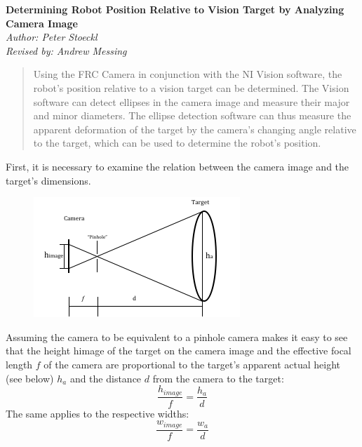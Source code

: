 \documentclass{article}
\begin{document}
\begin{titlepage}
   \begin{center}
      \Large\textbf{Determining Robot Position Relative to Vision Target by Analyzing Camera Image}\\
      \large\textit{Author: Peter Stoeckl}\\
      \large\textit{Revised by: Andrew Messing}
   \end{center}
\end{titlepage}

\begin{abstract}
Using the FRC Camera in conjunction with the NI Vision software, the robot’s position relative to a vision target can be determined. The Vision software can detect ellipses in the camera image and measure their major and minor diameters. The ellipse detection software can thus measure the apparent deformation of the target by the camera’s changing angle relative to the target, which can be used to determine the robot’s position. 
\end{abstract}

First, it is necessary to examine the relation between the camera image and the target’s dimensions.

		\begin{figure}[!htbp]

		\centering

		\includegraphics{pinhole_model.png}

		\end{figure}

Assuming the camera to be equivalent to a pinhole camera makes it easy to see that the height himage of the target on the camera image and the effective focal length $f$ of the camera are proportional to the target’s apparent actual height (see below) $h_{a}$ and the distance $d$ from the camera to the target: $$\frac{h_{image}}{f} = \frac{h_{a}}{d}$$  The same applies to the respective widths: $$\frac{w_{image}}{f} = \frac{w_{a}}{d}$$
\end{document}
